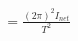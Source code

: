 \documentclass[preview]{standalone}
\begin{document}
\begin{align*}
= \frac{(2\pi)^2 I_{net}}{T^2}
\end{align*}
\end{document}
